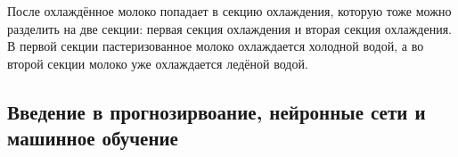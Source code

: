 {  \par \redline После охлаждённое молоко попадает в секцию охлаждения, которую тоже можно разделить на две секции: первая секция охлаждения и вторая секция охлаждения. В первой секции пастеризованное молоко охлаждается холодной водой, а во второй секции молоко уже охлаждается ледёной водой. 

  \par 
}

\subtitlespace

\subsection*{  
  \gostTitleFont
   Введение в прогнозирвоание, нейронные сети и машинное обучение
} 

\subtitlespace

